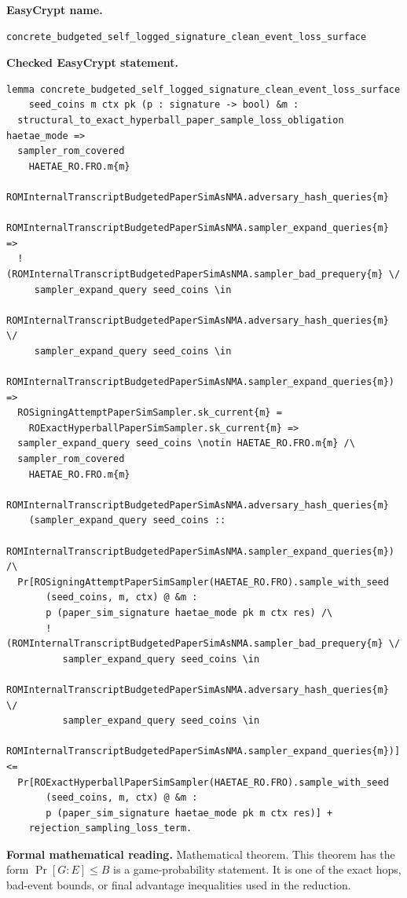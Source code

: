 \begin{formaltheorem}
\noindent\textbf{EasyCrypt name.}
\begin{lstlisting}[language=EasyCrypt,basicstyle=\ttfamily\scriptsize]
concrete_budgeted_self_logged_signature_clean_event_loss_surface
\end{lstlisting}
\noindent\textbf{Checked EasyCrypt statement.}
\begin{lstlisting}[language=EasyCrypt,basicstyle=\ttfamily\scriptsize]
lemma concrete_budgeted_self_logged_signature_clean_event_loss_surface
    seed_coins m ctx pk (p : signature -> bool) &m :
  structural_to_exact_hyperball_paper_sample_loss_obligation haetae_mode =>
  sampler_rom_covered
    HAETAE_RO.FRO.m{m}
    ROMInternalTranscriptBudgetedPaperSimAsNMA.adversary_hash_queries{m}
    ROMInternalTranscriptBudgetedPaperSimAsNMA.sampler_expand_queries{m} =>
  ! (ROMInternalTranscriptBudgetedPaperSimAsNMA.sampler_bad_prequery{m} \/
     sampler_expand_query seed_coins \in
       ROMInternalTranscriptBudgetedPaperSimAsNMA.adversary_hash_queries{m} \/
     sampler_expand_query seed_coins \in
       ROMInternalTranscriptBudgetedPaperSimAsNMA.sampler_expand_queries{m}) =>
  ROSigningAttemptPaperSimSampler.sk_current{m} =
    ROExactHyperballPaperSimSampler.sk_current{m} =>
  sampler_expand_query seed_coins \notin HAETAE_RO.FRO.m{m} /\
  sampler_rom_covered
    HAETAE_RO.FRO.m{m}
    ROMInternalTranscriptBudgetedPaperSimAsNMA.adversary_hash_queries{m}
    (sampler_expand_query seed_coins ::
       ROMInternalTranscriptBudgetedPaperSimAsNMA.sampler_expand_queries{m}) /\
  Pr[ROSigningAttemptPaperSimSampler(HAETAE_RO.FRO).sample_with_seed
       (seed_coins, m, ctx) @ &m :
       p (paper_sim_signature haetae_mode pk m ctx res) /\
       ! (ROMInternalTranscriptBudgetedPaperSimAsNMA.sampler_bad_prequery{m} \/
          sampler_expand_query seed_coins \in
            ROMInternalTranscriptBudgetedPaperSimAsNMA.adversary_hash_queries{m} \/
          sampler_expand_query seed_coins \in
            ROMInternalTranscriptBudgetedPaperSimAsNMA.sampler_expand_queries{m})] <=
  Pr[ROExactHyperballPaperSimSampler(HAETAE_RO.FRO).sample_with_seed
       (seed_coins, m, ctx) @ &m :
       p (paper_sim_signature haetae_mode pk m ctx res)] +
    rejection_sampling_loss_term.
\end{lstlisting}
\noindent\textbf{Formal mathematical reading.}
Mathematical theorem. This theorem has the form \(\Pr[G:E] \le B\) is a game-probability statement.  It is one of the exact hops, bad-event bounds, or final advantage inequalities used in the reduction.


\end{formaltheorem}
